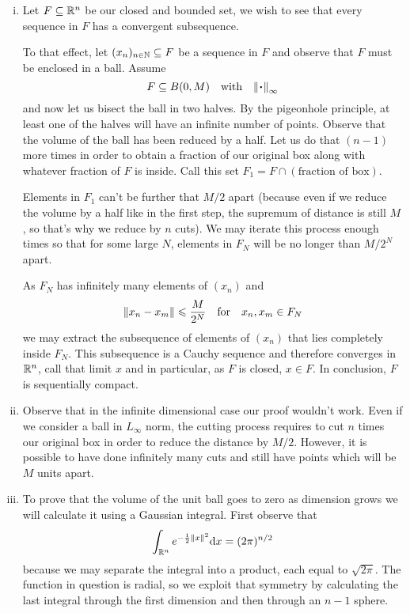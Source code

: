\documentclass[12pt]{memoir}
\begin{document}
\begin{ptcbr}
    \begin{enumerate}[i)]
        \item Let $F\subseteq\mathbb{R}^n$ be our closed and bounded set, we wish to see that every sequence in $F$ has a convergent subsequence.\par 
        To that effect, let $(x_n)_{n\in\mathbb{N}}\subseteq F$ be a sequence in $F$ and observe that $F$ must be enclosed in a ball. Assume 
        $$F\subseteq B(0,M)\word{with}\norm{\.}_\infty$$
        and now let us bisect the ball  in two halves.  By the pigeonhole principle, at least one of the halves will have an infinite number of points. Observe that the volume of the ball has been reduced by a half. Let us do that $(n-1)$ more times in order to obtain a fraction of our original box along with whatever fraction of $F$ is inside. Call this set $F_1=F\cap(\text{fraction of box})$.\par 
        Elements in $F_1$ can't be further that $M/2$ apart (because even if we reduce the volume by a half like in the first step, the supremum of distance is still $M$, so that's why we reduce by $n$ cuts). We may iterate this process enough times so that for some large $N$, elements in $F_N$ will be no longer than $M/2^N$ apart.\par 
        As $F_N$ has infinitely many elements of $(x_n)$ and 
        $$\norm{x_n-x_m}\leqslant \frac{M}{2^N}\quad\text{for}\quad x_n,x_m\in F_N$$
        we may extract the subsequence of elements of $(x_n)$ that lies completely inside $F_N$. This subsequence is a Cauchy sequence and therefore converges in $\mathbb{R}^n$, call that limit $x$ and in particular, as $F$ is closed, $x\in F$. In conclusion, $F$ is sequentially compact.
        \item Observe that in the infinite dimensional case our proof wouldn't work. Even if we consider a ball in $L_\infty$ norm, the cutting process requires to cut $n$ times our original box in order to reduce the distance by $M/2$. However, it is possible to have done infinitely many cuts and still have points which will be $M$ units apart.
        \item To prove that the volume of the unit ball goes to zero as dimension grows we will calculate it using a Gaussian integral. First observe that 
        $$\int_{\bR^n}e^{-\half\norm{x}^2}\dd x=(2\pi)^{n/2}$$
        because we may separate the integral into a product, each equal to $\sqrt{2\pi}$. The function in question is radial, so we exploit that symmetry by calculating the last integral through the first dimension and then through an $n-1$ sphere. 

\end{enumerate}
\end{ptcbr}
\end{document}
